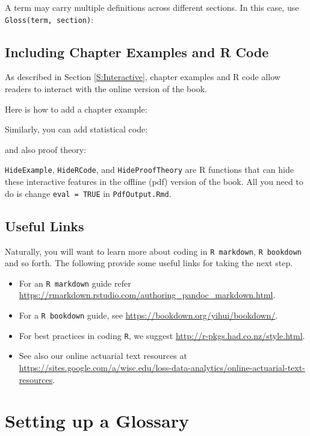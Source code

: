 \documentclass[
]{book}
\begin{document}
A term may carry multiple definitions across different sections. In this case, use \texttt{Gloss(term,\ section)}:

\hypertarget{including-chapter-examples-and-r-code}{%
\section{Including Chapter Examples and R Code}\label{including-chapter-examples-and-r-code}}

As described in Section \ref{S:Interactive}, chapter examples and R code allow readers to interact with the online version of the book.

Here is how to add a chapter example:

Similarly, you can add statistical code:

and also proof theory:

\texttt{HideExample}, \texttt{HideRCode}, and \texttt{HideProofTheory} are R functions that can hide these interactive features in the offline (pdf) version of the book. All you need to do is change \texttt{eval\ =\ TRUE} in \texttt{PdfOutput.Rmd}.

\hypertarget{S:Links}{%
\section{Useful Links}\label{S:Links}}

Naturally, you will want to learn more about coding in \texttt{R\ markdown}, \texttt{R\ bookdown} and so forth. The following provide some useful links for taking the next step.

\begin{itemize}
\item
  For an \texttt{R\ markdown} guide refer \url{https://rmarkdown.rstudio.com/authoring_pandoc_markdown.html}.
\item
  For a \texttt{R\ bookdown} guide, see \url{https://bookdown.org/yihui/bookdown/}.
\item
  For best practices in coding \texttt{R}, we suggest
  \url{http://r-pkgs.had.co.nz/style.html}.
\item
  See also our online actuarial text resources at
  \url{https://sites.google.com/a/wisc.edu/loss-data-analytics/online-actuarial-text-resources}.
\end{itemize}

\hypertarget{setting-up-a-glossary}{%
\chapter{Setting up a Glossary}\label{setting-up-a-glossary}}
\end{document}
